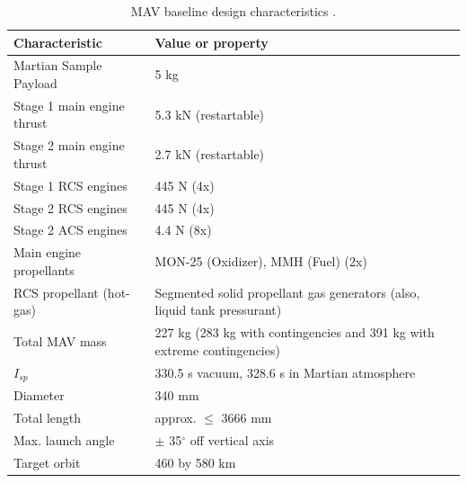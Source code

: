 \begin{table}[!ht]
\begin{center}
\caption{\ac{MAV} baseline design characteristics \cite{trinidad2012}.}
\label{tab:main_mav_bas_char}
\begin{tabular}{|l|l|}
\hline 
\textbf{Characteristic} 		&\textbf{Value or property}  \\ \hline \hline
Martian Sample Payload   &  5 kg  \\ \hline
Stage 1 main engine thrust   & 5.3 kN (restartable)   \\ \hline
Stage 2 main engine thrust   & 2.7 kN (restartable)  \\ \hline
Stage 1 \ac{RCS} engines   & 445 N (4x)    \\ \hline
Stage 2 \ac{RCS} engines   & 445 N (4x)    \\ \hline
Stage 2 \ac{ACS} engines   & 4.4 N (8x)  \\ \hline
Main engine propellants   & MON-25 (Oxidizer), MMH (Fuel) (2x)  \\ \hline
\ac{RCS} propellant (hot-gas)  &  Segmented solid propellant gas generators (also, liquid tank pressurant) \\ \hline
Total \ac{MAV} mass   & 227 kg (283 kg with contingencies and 391 kg with extreme contingencies)   \\ \hline
$I_{sp}$   &  330.5 s vacuum, 328.6 s in Martian atmosphere \\ \hline
Diameter   & 340 mm   \\ \hline
Total length   & approx. $\le$ 3666 mm \\ \hline
Max. launch angle   &  $\pm$ 35$^{\circ}$ off vertical axis  \\ \hline
Target orbit   & 460 by 580 km  \\ \hline
 		
\end{tabular}
\end{center}
\end{table} 

%



